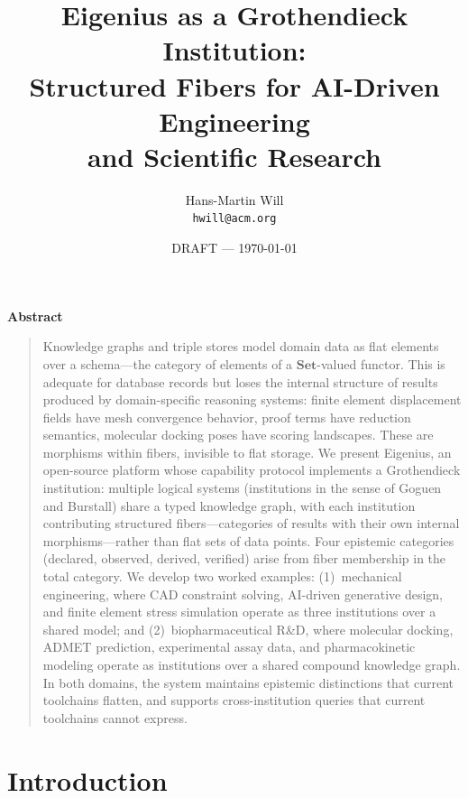 \documentclass[10pt,twocolumn,letterpaper]{article}
\makeatletter
\renewcommand{\maketitle}{%
  \twocolumn[%
    \begin{center}
      {\LARGE\bfseries\@title\par}
      \vskip 1em
      {\large\@author\par}
      \vskip 0.5em
      {\normalsize\itshape\@date\par}
      \vskip 1.5em
    \end{center}
  ]%
}
\renewenvironment{abstract}{%
  \small
  \begin{center}
    \textbf{Abstract}\vspace{-0.5em}
  \end{center}
  \begin{quotation}\noindent
}{%
  \end{quotation}\vspace{0.5em}\par
}
\newcommand{\Set}{\mathbf{Set}}
\makeatother
\begin{document}
\title{Eigenius as a Grothendieck Institution:\\Structured Fibers for AI-Driven Engineering\\and Scientific Research}

\author{%
  Hans-Martin Will\\
  \texttt{hwill@acm.org}
}

\date{DRAFT --- \today}

\maketitle
\thispagestyle{empty}

\begin{abstract}
Knowledge graphs and triple stores model domain data as flat elements over a schema---the category of elements of a $\Set$-valued functor.
This is adequate for database records but loses the internal structure of results produced by domain-specific reasoning systems: finite element displacement fields have mesh convergence behavior, proof terms have reduction semantics, molecular docking poses have scoring landscapes.
These are morphisms within fibers, invisible to flat storage.
We present Eigenius, an open-source platform whose capability protocol implements a Grothendieck institution: multiple logical systems (institutions in the sense of Goguen and Burstall) share a typed knowledge graph, with each institution contributing structured fibers---categories of results with their own internal morphisms---rather than flat sets of data points.
Four epistemic categories (declared, observed, derived, verified) arise from fiber membership in the total category.
We develop two worked examples: (1)~mechanical engineering, where CAD constraint solving, AI-driven generative design, and finite element stress simulation operate as three institutions over a shared model; and (2)~biopharmaceutical R\&D, where molecular docking, ADMET prediction, experimental assay data, and pharmacokinetic modeling operate as institutions over a shared compound knowledge graph.
In both domains, the system maintains epistemic distinctions that current toolchains flatten, and supports cross-institution queries that current toolchains cannot express.
\end{abstract}


\section{Introduction}
\label{sec:intro}
\end{document}
